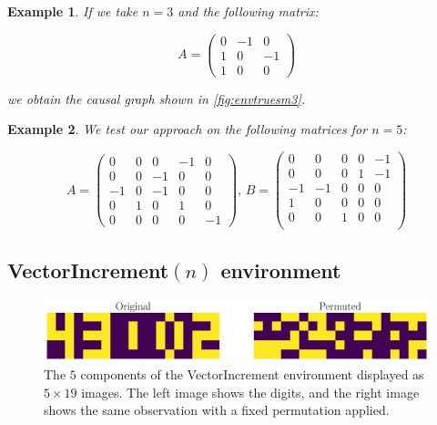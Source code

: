 \documentclass[a4paper,11pt,oneside]{report}
\newtheorem{example}{Example}[section]
\begin{document}
\begin{example}
    If we take $n=3$ and the following matrix:

    $$
    A=\left(
    \begin{array}{ccc}
    0&-1&0\\
    1&0&-1\\
    1&0&0
    \end{array}
    \right)
    $$

    we obtain the causal graph shown in \autoref{fig:envtruesm3}.
\end{example}

\begin{example}
    We test our approach on the following matrices for $n=5$:

    $$
    A=\left(
    \begin{array}{ccccc}
    0 & 0 & 0 & -1 & 0\\
    0 & 0 & -1 & 0 & 0\\
    -1 & 0 & -1 & 0 & 0\\
    0 &1 & 0 & 1 & 0\\
    0 & 0 & 0 & 0 & -1
    \end{array}
    \right),\,
    B=\left(
    \begin{array}{ccccc}
    0 & 0 & 0 & 0 & -1\\
    0 & 0 & 0 & 1 & -1\\
    -1 & -1 & 0 & 0 & 0\\
    1 & 0 & 0 & 0 & 0\\
    0 & 0 & 1 & 0 & 0\\
    \end{array}
    \right)
    $$

\end{example}

\subsection{VectorIncrement$(n)$ environment}
\begin{figure}
    \centering
    \includegraphics[width=0.7\linewidth]{plots/ve5_obs}
    \caption{The $5$ components of the VectorIncrement environment displayed as $5\times 19$ images. The left image shows the digits, and the right image shows the same observation with a fixed permutation applied.}
    \label{fig:ve5obs}
\end{figure}
\end{document}
